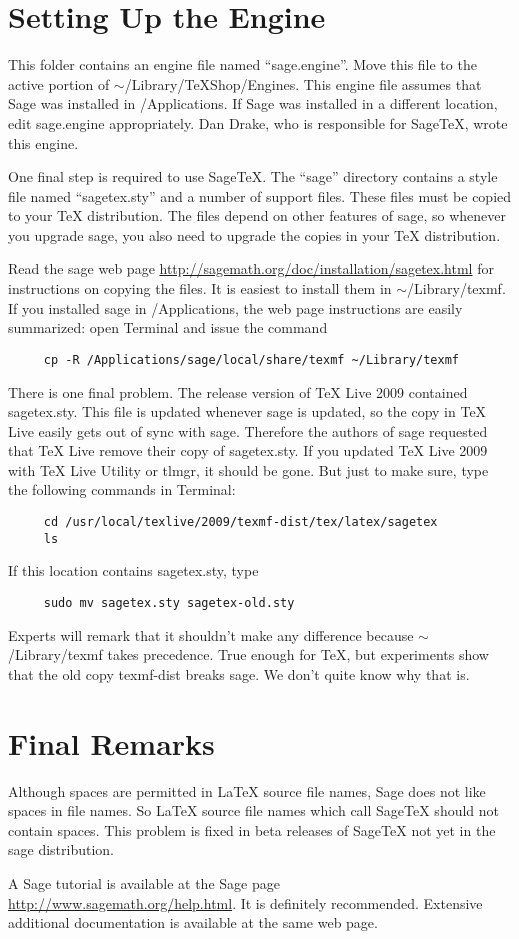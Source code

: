\documentclass[11pt, oneside]{amsart}
\begin{document}
\newpage
\section{Setting Up the Engine}

This folder contains an engine file named ``sage.engine''. Move this file to the active portion of $\sim$/Library/TeXShop/Engines. This engine file assumes that Sage was installed in /Applications. If Sage was installed in a different location, edit sage.engine appropriately. Dan Drake, who is responsible for SageTeX, wrote this engine.

One final step is required to use SageTeX. The ``sage'' directory contains a style file named ``sagetex.sty'' and a number of support files. These files must be copied to your TeX distribution. The files depend on other features of sage, so whenever you upgrade sage, you also need to upgrade the copies in your TeX distribution.

Read the sage web page \url{http://sagemath.org/doc/installation/sagetex.html} for instructions on copying the files. It is easiest to install them in $\sim$/Library/texmf. If you installed sage in /Applications, the web page instructions are easily summarized: open Terminal and issue the command
\begin{verbatim}
     cp -R /Applications/sage/local/share/texmf ~/Library/texmf
\end{verbatim}


There is one final problem. The release version of TeX Live 2009 contained sagetex.sty. This file is updated whenever sage is updated, so the copy in TeX Live easily gets out of sync with sage. Therefore the authors of sage requested that TeX Live remove their copy of sagetex.sty. If you updated TeX Live 2009 with TeX Live Utility or tlmgr, it should be gone. But just to make sure, type the following commands in Terminal:
\begin{verbatim}
     cd /usr/local/texlive/2009/texmf-dist/tex/latex/sagetex
     ls
\end{verbatim}
If this location contains sagetex.sty, type
\begin{verbatim}
     sudo mv sagetex.sty sagetex-old.sty
\end{verbatim}
Experts will remark that it shouldn't make any difference because $\sim$/Library/texmf takes precedence. True enough for TeX, but experiments show that the old copy texmf-dist breaks sage. We don't quite know why that is. 



\section{Final Remarks}
Although spaces are permitted in LaTeX source file names, Sage does not like spaces in file names. So LaTeX source file names which call SageTeX should not contain spaces. This problem is fixed in beta releases of SageTeX not yet in the sage distribution.

A Sage tutorial is available at the Sage page \url{http://www.sagemath.org/help.html}. It is definitely recommended. Extensive additional documentation is available at the same web page.
\end{document}
